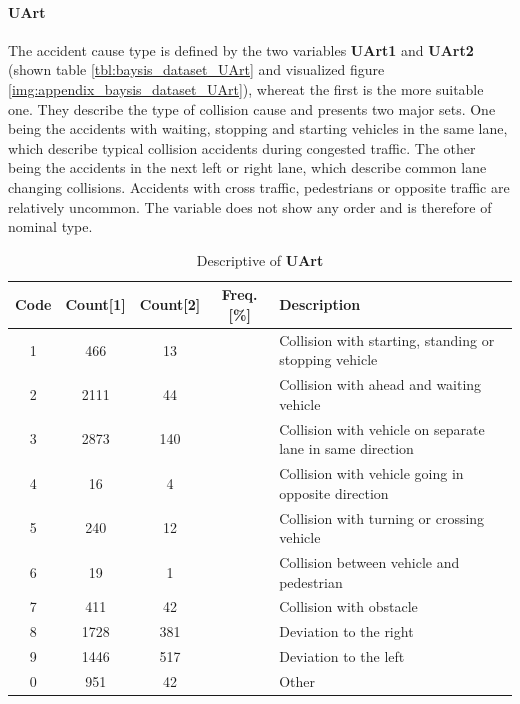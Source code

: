 \paragraph{UArt}
\label{baysis_dataset_UArt}
The accident cause type is defined by the two variables \textbf{UArt1} and \textbf{UArt2} (shown table \autoref{tbl:baysis_dataset_UArt} and visualized figure \autoref{img:appendix_baysis_dataset_UArt}), whereat the first is the more suitable one. They describe the type of collision cause and presents two major sets. One being the accidents with waiting, stopping and starting vehicles in the same lane, which describe typical collision accidents during congested traffic. The other being the accidents in the next left or right lane, which describe common lane changing collisions. Accidents with cross traffic, pedestrians or opposite traffic are relatively uncommon. The variable does not show any order and is therefore of nominal type.
\begin{table}[ht]
	\centering
	\small
	\begin{tabular}{c|c|c|c|l} 
		\toprule
		Code & Count[1] & Count[2] & Freq. [\%] & Description \\ 
		\midrule
 		1 & 466		& 13	& & Collision with starting, standing or stopping vehicle  \\ 
 		2 & 2111	& 44 	& & Collision with ahead and waiting vehicle  \\
 		3 & 2873	& 140	& & Collision with vehicle on separate lane in same direction  \\
 		4 &	16		& 4		& & Collision with vehicle going in opposite direction  \\
 		5 & 240		& 12	& & Collision with turning or crossing vehicle  \\
 		6 & 19		& 1		& & Collision between vehicle and pedestrian  \\
 		7 & 411		& 42	& & Collision with obstacle  \\
 		8 & 1728	& 381	& & Deviation to the right  \\
 		9 & 1446	& 517	& & Deviation to the left  \\
		0 & 951		& 42	& & Other  \\
		\bottomrule
	\end{tabular}
	\caption{Descriptive of \textbf{UArt}}
	\label{tbl:baysis_dataset_UArt}
	\vspace{-8mm}
\end{table}

